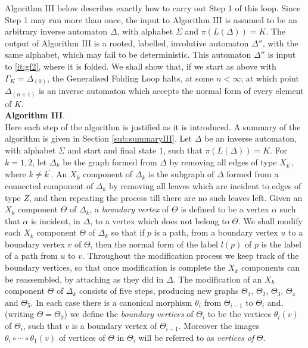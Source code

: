 \documentclass[a4paper,12pt]{article}
\renewcommand{\a}{\alpha }
\newcommand{\G}{\Gamma }
\newcommand{\D}{\Delta }
\newcommand{\T}{\Theta }
\renewcommand{\S}{\Sigma }
\numberwithin{equation}{section}
\numberwithin{figure}{section}
\begin{document}
Algorithm III below describes exactly how to carry out Step 1 of
this loop. Since Step 1 may run more than once,  the input to 
Algorithm III is assumed to be an arbitrary inverse automaton $\D$,
with alphabet $\S$ and $\pi(L(\D))=K$. The output of Algorithm III
is a rooted,
labelled, involutive automaton $\D''$, with the same alphabet, which may
fail to be deterministic. This automaton $\D''$ is input to \ref{it:gf2}, 
where it is folded. We shall show that, if we start as above
with $\G_K=\D_{(0)}$,  the Generalised Folding Loop halts, at some $n<\infty$; at
which point $\D_{(n+1)}$ is an inverse automaton which accepts the
normal form of every element of $K$. \\[1em]

\noindent\textbf{Algorithm III}. \\

Here each step of the algorithm is justified as it is introduced. A 
summary of the algorithm is given in Section \ref{sub:summaryIII}.  
Let $\D$ be an inverse automaton, with alphabet $\S$ and
start and final state $1$, such that
$\pi(L(\D))=K$.
For $k=1,2$, let $\D_k$ be the graph formed from $\D$ by removing all edges of
type $X_{k^\prime}$, where $k\neq k^\prime$. An $X_k$ component of
$\D_k$ is the subgraph of $\D$ formed from a connected component
of $\D_k$ by removing all leaves which are incident to edges of
type $Z$, and then repeating the process till there are no such
leaves left. Given an $X_k$ component $\T$ of $\D_k$,  a
{\em boundary vertex} of $\T$ is defined to be a vertex
$\a$ such that $\a$ is incident, in $\D$, to a vertex which does not
belong to $\T$.
 We shall modify each  $X_k$ component $\T$ of $\D_k$ so that if $p$ is a path,
from a  boundary vertex $u$  to a boundary vertex $v$ of $\T$,
then the normal form  of  the label $l(p)$ of $p$ is the label of
a path from $u$ to $v$. Throughout the modification process we
keep track of the boundary vertices, so that once modification is
complete the $X_k$ components can be reassembled, by attaching as
they did in $\D$. The modification of an $X_k$ component $\Theta$
of $\D_k$ consists of
five steps, producing new graphs $\T_1$, $\T_2$, $\T_3$, $\T_4$
and $\T_5$. In each case there is a canonical morphism $\theta_i$
from $\T_{i-1}$ to $\T_i$ and,
 (writing $\T=\T_0$)
we define the {\em boundary vertices} of $\T_{i}$ to be the vertices $\theta_{i}(v)$
of $\T_i$, such that $v$ is a boundary vertex of $\T_{i-1}$. Moreover the
 images $\theta_i\circ \cdots\circ \theta_1(v)$ of vertices of $\T$ in $\T_i$
will be referred to as  {\em vertices of} $\T$.
\end{document}
